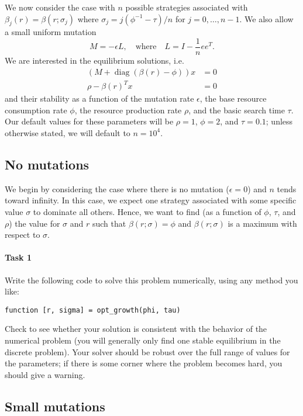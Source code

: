 \documentclass[12pt, leqno]{article} %
\begin{document}
We now consider the case with $n$ possible strategies associated with
$\beta_j(r) = \beta(r; \sigma_j)$ where
$\sigma_{j} = j (\phi^{-1}-\tau)/n$ for $j = 0, \ldots, n-1$.
We also allow a small uniform mutation
\[
  M = -\epsilon L, \quad \mbox{where} \quad L = I - \frac{1}{n} ee^T.
\]
We are interested in the equilibrium solutions, i.e.
\begin{align*}
  \left(M + \operatorname{diag}(\beta(r)-\phi)\right)x &= 0\\
  \rho - \beta(r)^T x &= 0
\end{align*}
and their stability as a function of the mutation rate $\epsilon$, the
base resource consumption rate $\phi$, the resource production rate
$\rho$, and the basic search time $\tau$.  Our default values for
these parameters will be $\rho = 1$, $\phi = 2$, and $\tau = 0.1$;
unless otherwise stated, we will default to $n = 10^4$.

\subsection{No mutations}

We begin by considering the case where there is no mutation
($\epsilon = 0$) and $n$ tends toward infinity.  In this case,
we expect one strategy associated with some specific value $\sigma$
to dominate all others.  Hence, we want to find
(as a function of $\phi$, $\tau$, and $\rho$) the value
for $\sigma$ and $r$ such that $\beta(r; \sigma) = \phi$ and
$\beta(r; \sigma)$ is a maximum with respect to $\sigma$.

\paragraph{Task 1}
Write the following code to solve this problem numerically,
using any method you like:
\begin{lstlisting}[frame=single]
function [r, sigma] = opt_growth(phi, tau)
\end{lstlisting}
Check to see whether your solution is consistent with the behavior
of the numerical problem (you will generally only find one
stable equilibrium in the discrete problem).  Your solver should
be robust over the full range of values for the parameters;
if there is some corner where the problem becomes hard, you should
give a warning.

\subsection{Small mutations}
\end{document}
